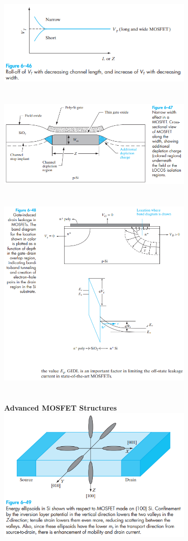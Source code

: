 \documentclass[8pt]{article}
\newcommand{\sect}[1]{\noindent\textbf{#1}\\}
\newcommand{\hl}{\noindent\makebox[\linewidth]{\rule{\textwidth}{0.2pt}}}
\begin{document}
\begin{center}
		\includegraphics[width=0.7\textwidth]{fig6-46} \\ \hl \\~\\
		\includegraphics[width=0.7\textwidth]{fig6-47} \\ \hl \\~\\
		\includegraphics[width=0.7\textwidth]{fig6-48} \\ \hl \\~\\
		\sect{\Large{Advanced MOSFET Structures}}
		\includegraphics[width=0.7\textwidth]{fig6-49} \\ \hl \\~\\

\end{center}
\end{document}
